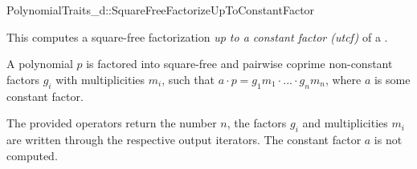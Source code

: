 \begin{ccRefConcept}{PolynomialTraits_d::SquareFreeFactorizeUpToConstantFactor}

\ccDefinition

This  computes a square-free factorization 
{\em up to a constant factor (utcf)} of a 
. 

A polynomial $p$ is factored into square-free and pairwise coprime non-constant
factors $g_i$ with multiplicities $m_i$, such that 
$a  \cdot  p = g_1m_1  \cdot  ...  \cdot  g_nm_n$, where $a$ is some constant factor. 

The provided operators return the number $n$, the factors $g_i$ and 
multiplicities $m_i$ are written through the respective output iterators.
The constant factor $a$ is not computed.
          
\ccRefines 

\ccTypes

\ccOperations



% 
%          




\end{ccRefConcept}
